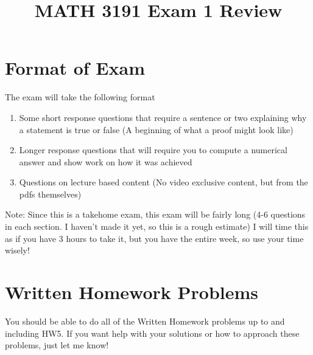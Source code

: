 \documentclass[12pt]{exam}
\title{MATH 3191 Exam 1 Review}
\date{}
\begin{document}
\maketitle
\section{Format of Exam}
The exam will take the following format
\begin{enumerate}
    \item Some short response questions that require a sentence or two explaining why a statement
        is true or false (A beginning of what a proof might look like)
    \item Longer response questions that will require you to compute a numerical answer and show work
        on how it was achieved
    \item Questions on lecture based content (No video exclusive content, but from the pdfs themselves)
\end{enumerate}
Note: Since this is a takehome exam, this exam will be fairly long (4-6 questions in each section. I haven't made it yet, so this is a rough estimate)
I will time this as if you have 3 hours to take it, but you have the entire week, so use your time wisely!
\section{Written Homework Problems}
You should be able to do all of the Written Homework problems up to and including HW5. If you want
help with your solutions or how to approach these problems, just let me know!
\end{document}
